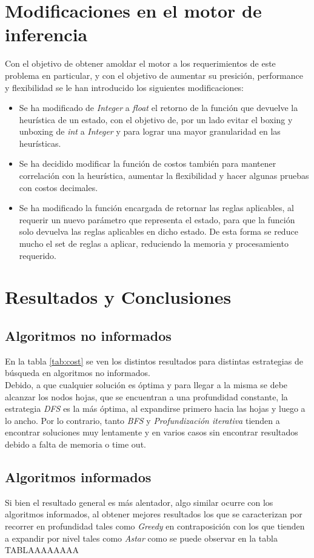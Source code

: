 \documentclass{sig-alternate}
\begin{document}
\section*{Modificaciones en el motor de inferencia}
Con el objetivo de obtener amoldar el motor a los requerimientos de este problema en particular, y con el objetivo de aumentar su presici\'on, performance y flexibilidad se  le han introducido los siguientes modificaciones:
\begin{itemize}
	\item Se ha modificado de \emph{Integer} a \emph{float} el retorno de la funci\'on que devuelve la heur\'istica de un estado, con el objetivo de, por un lado evitar el boxing y unboxing de \emph{int} a \emph{Integer} y para lograr una mayor granularidad en las heur\'isticas.
	\item Se ha decidido modificar la funci\'on de costos tambi\'en para mantener correlaci\'on con la heur\'istica, aumentar la flexibilidad y hacer algunas pruebas con costos decimales.
	\item Se ha modificado la funci\'on encargada de retornar las reglas aplicables, al requerir un nuevo par\'ametro que representa el estado, para que la funci\'on solo devuelva las reglas aplicables en dicho estado. De esta forma se reduce mucho el set de reglas a aplicar, reduciendo la memoria y procesamiento requerido.
	\end{itemize}

\section*{Resultados y Conclusiones}
\subsection*{Algoritmos no informados}	
En la tabla \ref{tab:cost} se ven los distintos resultados para distintas estrategias de b\'usqueda	 en algoritmos no informados. \\
Debido, a que cualquier soluci\'on es \'optima y para llegar a la misma se debe alcanzar los nodos hojas, que se encuentran a una profundidad constante, la estrategia  \emph{DFS} es la m\'as \'optima, al expandirse primero hacia las hojas y luego a lo ancho. Por lo contrario, tanto \emph{BFS} y \emph{Profundizaci\'on iterativa} tienden a encontrar soluciones muy lentamente y en varios casos sin encontrar resultados debido a falta de memoria o time out. \\
\subsection*{Algoritmos informados}
Si bien el resultado general es m\'as alentador, algo similar ocurre con los algoritmos informados, al obtener mejores resultados los que se caracterizan por recorrer en profundidad tales como \emph{Greedy} en contraposici\'on con los que tienden a expandir por nivel tales como \emph{Astar} como se puede observar en la tabla TABLAAAAAAAA\\
\end{document}

